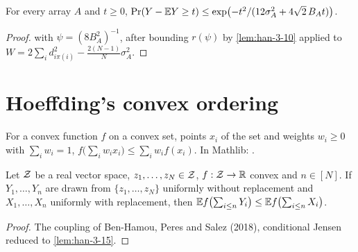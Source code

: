 \begin{theorem}
  \label{thm:han-3-7}
  For every array $A$ and $t\ge0$, $\Pr(Y-\mathbb{E} Y\ge t)\le\exp\bigl(-t^2/(12\sigma_A^2+4\sqrt2\,B_At)\bigr)$.
\end{theorem}
\begin{proof}
   with $\psi=(8B_A^2)^{-1}$, after bounding $r(\psi)$ by \cref{lem:han-3-10} applied to $W=2\sum_id_{i\pi(i)}^2-\frac{2(N-1)}N\sigma_A^2$.
\end{proof}

\section{Hoeffding's convex ordering}

\begin{lemma}
  \label{lem:han-3-15}
  \mathlibok
  For a convex function $f$ on a convex set, points $x_i$ of the set and weights $w_i\ge0$ with $\sum_iw_i=1$, $f\bigl(\sum_iw_ix_i\bigr)\le\sum_iw_if(x_i)$.
  In Mathlib: .
\end{lemma}

\begin{theorem}
  \label{thm:han-3-8}
  Let $\mathcal{Z}$ be a real vector space, $z_1,\dots,z_N\in\mathcal{Z}$, $f:\mathcal{Z}\to\mathbb{R}$ convex and $n\in[N]$. If $Y_1,\dots,Y_n$ are drawn from $\{z_1,\dots,z_N\}$ uniformly without replacement and $X_1,\dots,X_n$ uniformly with replacement, then $\mathbb{E} f\bigl(\sum_{i\le n}Y_i\bigr)\le\mathbb{E} f\bigl(\sum_{i\le n}X_i\bigr)$.
\end{theorem}
\begin{proof}
  The coupling of Ben-Hamou, Peres and Salez (2018), conditional Jensen reduced to \cref{lem:han-3-15}.
\end{proof}

